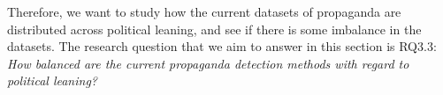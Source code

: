 
Therefore, we want to study how the current datasets of propaganda are distributed across political leaning, and see if there is some imbalance in the datasets.
%
%
The research question that we aim to answer in this section is RQ3.3: \emph{How balanced are the current propaganda detection methods with regard to political leaning?}











